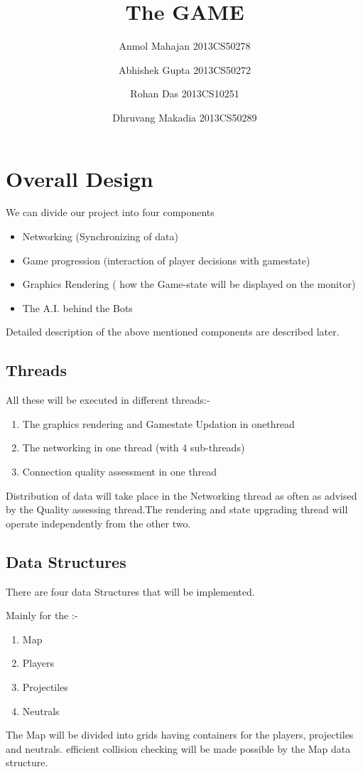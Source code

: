\documentclass[ebook,12pt,oneside,openany]{article}
\title{The GAME}
\author{Anmol Mahajan 2013CS50278  \and Abhishek Gupta 2013CS50272 \and Rohan Das 2013CS10251	\and Dhruvang Makadia 2013CS50289}
\begin{document}
\maketitle

\tableofcontents

\cleardoublepage

\section{Overall Design}

We can divide our project into four components 
\begin{itemize}
\item Networking (Synchronizing of data)
\item Game progression (interaction of player decisions with gamestate)
\item Graphics Rendering ( how the Game-state will be displayed on the monitor)
\item The A.I. behind the Bots 
\end{itemize}

Detailed description of the above mentioned components are described later.
\subsection{Threads}
All these will be executed in different threads:-
\begin{enumerate}
\item The graphics rendering and Gamestate Updation in onethread
\item The networking in one thread (with 4 sub-threads)
\item Connection quality assessment in one thread
\end{enumerate}
Distribution of data will take place in the Networking thread as often as advised by the Quality assessing thread.The rendering and state upgrading thread will operate independently from the other two.
\subsection{Data Structures}
There are four data Structures that will be implemented.

Mainly for the :-
\begin{enumerate}
\item Map
\item Players
\item Projectiles
\item Neutrals
\end{enumerate}
The Map will be divided into grids having containers for the players, projectiles and neutrals.
efficient collision checking will be made possible by the Map data structure.
\end{document}
